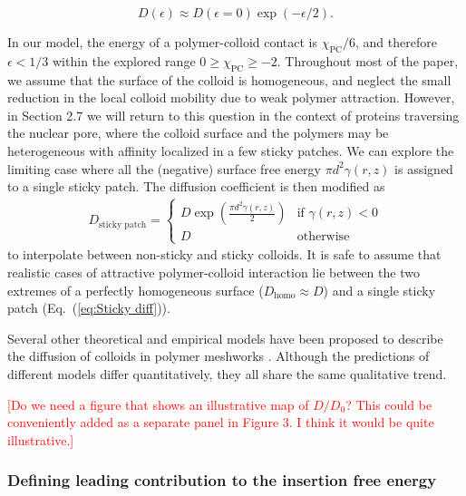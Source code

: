 \documentclass[12pt, a4paper]{article}
\newcommand\todo[1]{\textcolor{red}{#1}}
\begin{document}
\begin{equation}
    D(\epsilon)\approx D(\epsilon=0) \exp (-\epsilon / 2).
    \label{eq:Yamamoto}
\end{equation}

In our model, the energy of a polymer-colloid contact is $\chi_{\text{PC}}/6$, and therefore $\epsilon < 1/3$ within the explored range $0\geq\chi_{\text{PC}}\geq-2$.
Throughout most of the paper, we assume that the surface of the colloid is homogeneous, and neglect the small reduction in the local colloid mobility due to weak polymer attraction.
However, in Section 2.7 we will return to this question in the context of proteins traversing the nuclear pore, where the colloid surface and the polymers may be heterogeneous with affinity localized in a few sticky patches.
We can explore the limiting case where all the (negative) surface free energy $\pi d^2 \gamma(r,z)$ is assigned to a single sticky patch.
The diffusion coefficient is then modified as
\begin{eqnarray}
    D_{\text{sticky patch}} = 
    \begin{cases}
        D \exp(\frac{\pi d^2 \gamma(r,z)}{2}) & \text{if } \gamma(r,z) < 0 \\
        D & \text{otherwise}
    \end{cases}
     \label{eq:Sticky diff}
\end{eqnarray}
to interpolate between non-sticky and sticky colloids.
It is safe to assume that realistic cases of attractive polymer-colloid interaction lie between the two extremes of a perfectly homogeneous surface ($D_\text{homo} \approx D$) and a single sticky patch (Eq.~(\ref{eq:Sticky diff})).

Several other theoretical and empirical models have been proposed to describe the diffusion of colloids in polymer meshworks \cite{Schweizer2003,Kohli2012,Holyst2009,Phillies1988}.
Although the predictions of different models differ quantitatively, they all share the same qualitative trend.

\todo{[Do we need a figure that shows an illustrative map of $D/D_0$? This could be conveniently added as a separate panel in Figure 3. I think it would be quite illustrative.]}


\subsubsection{Defining leading contribution to the insertion free energy}
\end{document}
